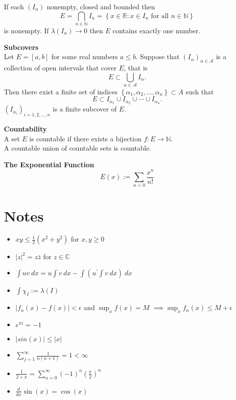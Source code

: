 \documentclass[a4paper, 10pt]{article}
\begin{document}
\begin{multicols*}{3}
If each $\left(I_n\right)$ nonempty, closed and bounded then
$$
E=\bigcap_{n \in \mathbb{N}} I_n=\left\{x \in \mathbb{R}: x \in I_n \text { for all } n \in \mathbb{N}\right\}
$$
is nonempty. 
If $\lambda\left(I_n\right) \rightarrow 0$ then $E$ contains exactly one number.

\textbf{Subcovers} \\
Let $E=[a, b]$ for some real numbers $a \leq b$. Suppose that $\left(I_\alpha\right)_{\alpha \in \mathcal{A}}$ is a collection of open intervals that cover $E$, that is
$$
E \subset \bigcup_{\alpha \in \mathcal{A}} I_\alpha .
$$
Then there exist a finite set of indices $\left\{\alpha_1, \alpha_2, \ldots, \alpha_n\right\} \subset A$ such that
$$
E \subset I_{\alpha_1} \cup I_{\alpha_2} \cup \cdots \cup I_{\alpha_n} .
$$
$\left(I_{\alpha_i}\right)_{i=1,2, \ldots, n}$ is a finite subcover of $E$.

\textbf{Countability}\\
A set $E$ is countable if there exists a bijection $f: E \rightarrow \mathbb{N}$.\\
A countable union of countable sets is countable. 

\textbf{The Exponential Function}\\
$$E(x):=\sum_{n=0} \frac{x^n}{n !}$$

\section*{Notes}
\begin{itemize}[label=\textbullet, labelsep=0.3em, leftmargin=1em]
\item $x y \leq \frac{1}{2}\left(x^2+y^2\right) \text { for } x, y \geq 0$
\item $|z|^2=z \bar{z} \text { for } z \in \mathbb{C}$
\item $\int uv\ dx=u \int v\ dx-\int (u^{\prime} \int v \ dx )\ dx$
\item $\int \chi_I:=\lambda(I)$
\item $|f_n(x) - f(x)| < \epsilon $ and $ \sup_x f(x) = M$
$\implies \sup_x f_n(x) \leq M + \epsilon$
\item $e^{\pi i}=-1$
\item $|sin(x)|\leq |x|$
\item $\sum_{j=1}^{\infty} \frac{1}{n(n+1)}=1<\infty$
\item $\frac{1}{2+x}=\sum_{n=0}^{\infty}(-1)^n\left(\frac{x}{2}\right)^n$
\item $\frac{d}{d x} \sin (x)=\cos (x)$
\end{itemize}


\end{multicols*}
\end{document}
